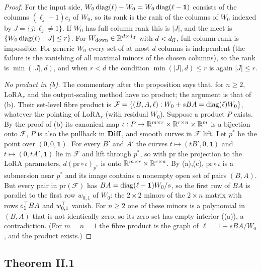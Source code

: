 \begin{proof}
For the input side, $W_0\operatorname{diag}(\ell)-W_0=W_0\operatorname{diag}(\ell-\mathbf 1)$ consists of the columns $(\ell_j-1)c_j$ of $W_0$, so its
rank is the rank of the columns of $W_0$ indexed by $J=\{j:\ell_j\ne1\}$. If $W_0$ has full column rank this is $\lvert
J\rvert$, and the meet is $\{W_0\operatorname{diag}(\ell):\lvert J\rvert\le r\}$. For $W_{\rm down}\in\mathbb{R}^{d\times d_{\rm ff}}$ with
$d<d_{\rm ff}$, full column rank is impossible. For generic $W_0$ every set of at most $d$ columns is independent (the
failure is the vanishing of all maximal minors of the chosen columns), so the rank is $\min(\lvert J\rvert,d)$, and when
$r<d$ the condition $\min(\lvert J\rvert,d)\le r$ is again $\lvert J\rvert\le r$.

\emph{No product in (b).} The commentary after the proposition says that, for $n\ge2$, $\mathrm{LoRA}_r$ and the
output-scaling method have no product; the argument is that of (b). Their set-level fibre product
is $\mathcal F=\{(B,A,\ell):W_0+sBA=\operatorname{diag}(\ell)W_0\}$, whatever the pointing of $\mathrm{LoRA}_r$ (with residual $W_0$).
Suppose a product $P$ exists. By the proof of (b) its canonical map $\iota:P\to\mathbb{R}^{m\times
r}\times\mathbb{R}^{r\times n}\times\mathbb{R}^m$ is a bijection onto $\mathcal F$, $P$ is also the pullback in $\mathbf{Diff}$, and smooth curves
in $\mathcal F$ lift. Let $p^*$ be the point over $(0,0,\mathbf 1)$. For every $B'$ and $A'$ the curves $t\mapsto(tB',0,\mathbf
1)$ and $t\mapsto(0,tA',\mathbf 1)$ lie in $\mathcal F$ and lift through $p^*$, so with $\mathrm{pr}$ the projection to the
LoRA parameters, $d(\mathrm{pr}\circ\iota)_{p^*}$ is onto $\mathbb{R}^{m\times r}\times\mathbb{R}^{r\times n}$. By (a),(c),
$\mathrm{pr}\circ\iota$ is a submersion near $p^*$ and its image contains a nonempty open set of pairs $(B,A)$. But every pair
in $\mathrm{pr}(\mathcal F)$ has $BA=\operatorname{diag}(\ell-\mathbf 1)W_0/s$, so the first row of $BA$ is parallel to the first row
$w_{0,1}$ of $W_0$: the $2\times2$ minors of the $2\times n$ matrix with rows $e_1^{\top} BA$ and $w_{0,1}^{\top}$ vanish. For
$n\ge2$ one of these minors is a polynomial in $(B,A)$ that is not identically zero, so its zero set has empty interior
((a)), a contradiction. (For $m=n=1$ the fibre product is the graph of $\ell=1+sBA/W_0$, and the product
exists.)
\end{proof}

\subsection{Theorem II.1}\label{proof:II.1}

